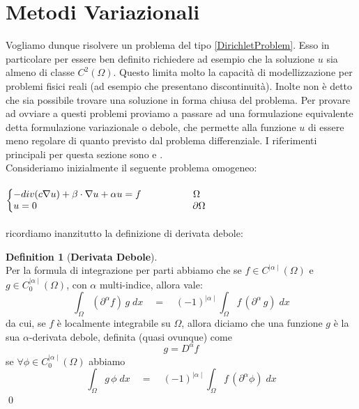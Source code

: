 \documentclass[12pt,a4paper]{report}
\makeatletter
\theoremstyle{theorem}
\theoremstyle{definition}
\newtheorem{definition}{Definition}[section]
\newenvironment{system}
{\left\lbrace\begin{array}{@{}l@{}}}
{\end{array}\right.}
\makeatother
\begin{document}
\section{Metodi Variazionali}
Vogliamo dunque risolvere un problema del tipo \ref{DirichletProblem}. Esso in particolare per essere ben definito richiedere ad esempio che la soluzione $u$ sia almeno di classe $C^2(\Omega)$. Questo limita molto la capacità di modellizzazione per problemi fisici reali (ad esempio che presentano discontinuità). Inolte non è detto che sia possibile trovare una soluzione in forma chiusa del problema. Per provare ad ovviare a questi problemi proviamo a passare ad una formulazione equivalente detta formulazione variazionale o debole, che permette alla funzione $u$ di essere meno regolare di quanto previsto dal problema differenziale. I riferimenti principali per questa sezione sono \cite{Brezis} e \cite{Evans}.\\
Consideriamo inizialmente il seguente problema omogeneo:\\\\
 \label{DirichletProblemHom}
\begin{math}
\begin{system}
-div(c\nabla{u})+\beta \cdot \nabla{u} + \alpha u = f \qquad \qquad \quad \ \Omega \\
u = 0 \quad \qquad \qquad \qquad \qquad \qquad \qquad \qquad \quad \partial \Omega \\
\end{system}
\end{math}
\hfill \\\\
ricordiamo inanzitutto la definizione di derivata debole:
\begin{definition} [\textbf{Derivata Debole}]
\hfill \\
Per la formula di integrazione per parti abbiamo che se $f \in C^{\mid \alpha \mid}(\Omega)$ e $g \in C_{0}^{\mid \alpha \mid}(\Omega)$, con $\alpha$ multi-indice, allora vale:
\[ \int_{\Omega} { (\partial^{\alpha} f) \, g \; dx } \quad = \quad (-1)^{\mid \alpha \mid} \int_{\Omega} { f \, (\partial^{\alpha} \, g) \;dx } \]
da cui, se $f$ è localmente integrabile su $\Omega$, allora diciamo che una funzione $g$ è la sua $\alpha$-derivata debole, definita (quasi ovunque) come
\[ g = D^{ \alpha }f \]
se $\forall \phi \in  C_{0}^{\mid \alpha \mid}(\Omega)$ abbiamo
\[ \int_{\Omega} { g \, \phi \; dx } \quad = \quad (-1)^{\mid \alpha \mid} \int_{\Omega} { f \, (\partial^{\alpha} \phi) \; dx} \]
\qed
\end{definition}
\end{document}
